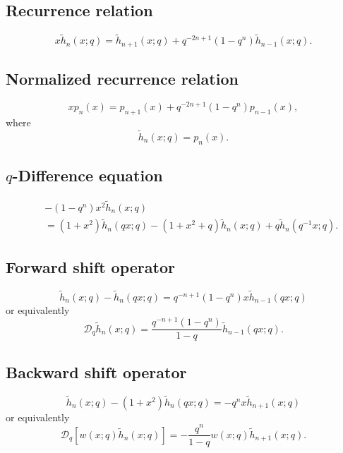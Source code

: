 \documentclass[envcountchap,graybox]{svmono}
\begin{document}
{{\subsection*{Recurrence relation}
\begin{equation}
\label{RecDiscreteqHermiteII}
x{\tilde h}_n(x;q)={\tilde h}_{n+1}(x;q)+q^{-2n+1}(1-q^n){\tilde h}_{n-1}(x;q).
\end{equation}

\subsection*{Normalized recurrence relation}
\begin{equation}
\label{NormRecDiscreteqHermiteII}
xp_n(x)=p_{n+1}(x)+q^{-2n+1}(1-q^n)p_{n-1}(x),
\end{equation}
where
$${\tilde h}_n(x;q)=p_n(x).$$

\subsection*{$q$-Difference equation}
\begin{eqnarray}
\label{dvDiscreteqHermiteII}
& &-(1-q^n)x^2{\tilde h}_n(x;q)\nonumber\\
& &{}=(1+x^2){\tilde h}_n(qx;q)-(1+x^2+q){\tilde h}_n(x;q)+q{\tilde h}_n(q^{-1}x;q).
\end{eqnarray}

\subsection*{Forward shift operator}
\begin{equation}
\label{shift1DiscreteqHermiteII-I}
\tilde{h}_n(x;q)-\tilde{h}_n(qx;q)=q^{-n+1}(1-q^n)x\tilde{h}_{n-1}(qx;q)
\end{equation}
or equivalently
\begin{equation}
\label{shift1DiscreteqHermiteII-II}
\mathcal{D}_q\tilde{h}_n(x;q)=\frac{q^{-n+1}(1-q^n)}{1-q}\tilde{h}_{n-1}(qx;q).
\end{equation}

\subsection*{Backward shift operator}
\begin{equation}
\label{shift2DiscreteqHermiteII-I}
\tilde{h}_n(x;q)-(1+x^2)\tilde{h}_n(qx;q)=-q^nx\tilde{h}_{n+1}(x;q)
\end{equation}
or equivalently
\begin{equation}
\label{shift2DiscreteqHermiteII-II}
\mathcal{D}_q\left[w(x;q)\tilde{h}_n(x;q)\right]
=-\frac{q^n}{1-q}w(x;q)\tilde{h}_{n+1}(x;q).
\end{equation}

}}
\end{document}

